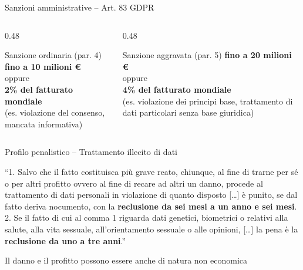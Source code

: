 \documentclass[aspectratio=169]{beamer}
\begin{document}
\begin{frame}{Sanzioni amministrative -- Art. 83 GDPR}
  \vspace{0.3cm}
  \begin{columns}[T]
    \begin{column}{0.48\textwidth}
      \begin{block}{Sanzione ordinaria (par. 4)}
        \centering
        \textbf{fino a 10 milioni €}\\
        oppure\\
        \textbf{2\% del fatturato mondiale}\\[0.2em]
        \small (es. violazione del consenso, mancata informativa)
      \end{block}
    \end{column}
    \begin{column}{0.48\textwidth}
      \begin{alertblock}{Sanzione aggravata (par. 5)}
        \centering
        \textbf{fino a 20 milioni €}\\
        oppure\\
        \textbf{4\% del fatturato mondiale}\\[0.2em]
        \small (es. violazione dei principi base, trattamento di dati particolari senza base giuridica)
      \end{alertblock}
    \end{column}
  \end{columns}

\end{frame}

\begin{frame}{Profilo penalistico -- Trattamento illecito di dati}

  \begin{normabox}
    \small
    ``1. Salvo che il fatto costituisca più grave reato, chiunque, al fine di
    trarne per sé o per altri profitto ovvero al fine di recare ad altri un danno,
    procede al trattamento di dati personali in violazione di quanto disposto
    [\ldots] è punito, se dal fatto deriva nocumento, con la \textbf{reclusione da sei
    mesi a un anno e sei mesi}.\\[0.3em]
    2. Se il fatto di cui al comma 1 riguarda dati
    genetici, biometrici o relativi alla salute, alla vita sessuale, all'orientamento
    sessuale o alle opinioni, [\ldots] la pena è la \textbf{reclusione da uno a tre anni}.''
  \end{normabox}

  \vspace{0.2cm}
  Il danno e il profitto possono essere anche di natura non economica


\end{frame}
\end{document}
